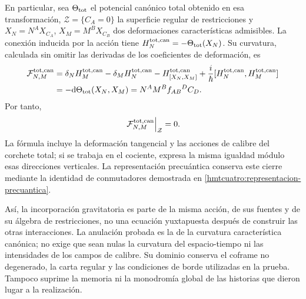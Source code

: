 En particular, sea $\Theta_{\rm tot}$ el potencial canónico total
obtenido en esa transformación, $\mathcal Z=\{C_A=0\}$ la superficie
regular de restricciones y $X_N=N^AX_{C_A}$,
$X_M=M^BX_{C_B}$ dos deformaciones características admisibles.
La conexión inducida por la acción tiene
$H_N^{\rm tot,can}=-\Theta_{\rm tot}(X_N)$. Su curvatura, calculada
sin omitir las derivadas de los coeficientes de deformación, es
\begin{equation}
\begin{aligned}
\mathcal F^{\rm tot,can}_{N,M}
&=\delta_NH_M^{\rm tot,can}-\delta_MH_N^{\rm tot,can}
 -H_{[X_N,X_M]}^{\rm tot,can}
 +\frac{i}{\hbar}[H_N^{\rm tot,can},H_M^{\rm tot,can}]\\
&=-\mathrm d\Theta_{\rm tot}(X_N,X_M)
 =N^AM^B f_{AB}{}^{D}C_D.
\end{aligned}
\label{hmtcuatro:conclusion-curvatura-total}
\end{equation}
Por tanto,
\[
 \left.\mathcal F^{\rm tot,can}_{N,M}\right|_{\mathcal Z}=0.
\]
La fórmula incluye la deformación tangencial y las acciones de
calibre del corchete total; si se trabaja en el cociente, expresa
la misma igualdad módulo esas direcciones verticales. La
representación precuántica conserva este cierre mediante la
identidad de conmutadores demostrada en
\eqref{hmtcuatro:representacion-precuantica}.

Así, la incorporación gravitatoria es parte de la misma acción,
de sus fuentes y de su álgebra de restricciones, no una ecuación
yuxtapuesta después de construir las otras interacciones. La
anulación probada es la de la curvatura característica canónica;
no exige que sean nulas la curvatura del espacio-tiempo ni las
intensidades de los campos de calibre. Su dominio conserva el
coframe no degenerado, la carta regular y las condiciones de
borde utilizadas en la prueba. Tampoco suprime la memoria ni la
monodromía global de las historias que dieron lugar a la
realización.
